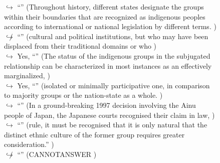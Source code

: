 \documentclass[11pt,a4paper, onecolumn]{article}
\begin{document}
\begin{figure}[t] \small \begin{tcolorbox}[boxsep=0pt,left=5pt,right=0pt,top=2pt,colback = yellow!5] \begin{dialogue}
 \small 
\colorbox{pink!25}{$\hookrightarrow$}
{ ``'' (Throughout history, different states designate the groups within their boundaries that are recognized as indigenous peoples according to international or national legislation by different terms. ) }
\\
\colorbox{pink!25}{$\not\hookrightarrow$}
{ ``'' (cultural and political institutions, but who may have been displaced from their traditional domains or who ) }
\\
\colorbox{pink!25}{$\hookrightarrow$}
\colorbox{red!25}{Yes,}
{ ``'' (The status of the indigenous groups in the subjugated relationship can be characterized in most instances as an effectively marginalized, ) }
\\
\colorbox{pink!25}{$\hookrightarrow$}
\colorbox{red!25}{Yes,}
{ ``'' (isolated or minimally participative one, in comparison to majority groups or the nation-state as a whole. ) }
\\
\colorbox{pink!25}{$\hookrightarrow$}
{ ``'' (In a ground-breaking 1997 decision involving the Ainu people of Japan, the Japanese courts recognised their claim in law, ) }
\\
\colorbox{pink!25}{$\hookrightarrow$}
{ ``'' (rule, it must be recognised that it is only natural that the distinct ethnic culture of the former group requires greater consideration.'' ) }
\\
\colorbox{pink!25}{$\not\hookrightarrow$}
{ ``'' (CANNOTANSWER ) }
\\
 \end{dialogue}\end{tcolorbox}\end{figure}
\end{document}
